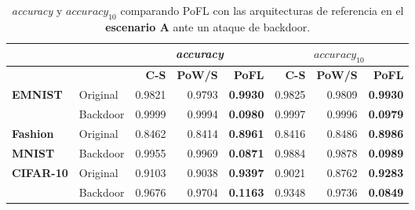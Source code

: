 \begin{table}[!ht]
\centering
\begin{tabular}{llrrrrrr}
\toprule
 & & \multicolumn{3}{c}{\textit{accuracy}} & \multicolumn{3}{c}{\textit{$accuracy_{10}$}}   \\
\toprule
       &          & \textbf{C-S} & \textbf{PoW/S} & \textbf{PoFL} & \textbf{C-S} & \textbf{PoW/S} & \textbf{PoFL}  \\ 
\toprule
\textbf{EMNIST} & Original & 0.9821        & 0.9793  & \textbf{0.9930}  & 0.9825        & 0.9809  & \textbf{0.9930}   \\  
       & Backdoor & 0.9999        & 0.9994  & \textbf{0.0980} & 0.9997        & 0.9996  & \textbf{0.0979}   \\  
\midrule
\textbf{Fashion}   & Original & 0.8462        & 0.8414  & \textbf{0.8961}  & 0.8416        & 0.8486  & \textbf{0.8986}  \\ 
 \textbf{MNIST}    & Backdoor & 0.9955        & 0.9969  & \textbf{0.0871}& 0.9884        & 0.9878  & \textbf{0.0989}   \\ 
\midrule
\textbf{CIFAR-10}        & Original & 0.9103        & 0.9038  & \textbf{0.9397}  & 0.9021        & 0.8762  & \textbf{0.9283}   \\ 
                & Backdoor & 0.9676        & 0.9704  & \textbf{0.1163}   & 0.9348        & 0.9736  & \textbf{0.0849}  \\ 
\bottomrule
\end{tabular}
\caption{\textit{accuracy} y \textit{$accuracy_{10}$} comparando PoFL con las arquitecturas de referencia en el \textbf{escenario A} ante un ataque de backdoor.}\label{tab:poflbackdoor_a}
\end{table}

